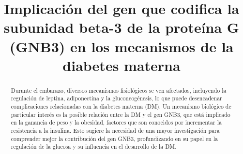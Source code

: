 \documentclass{bmcart}
\begin{document}
	\begin{frontmatter}
	
		\begin{fmbox}
			
			
			\title{Implicación del gen que codifica la subunidad beta-3 de la proteína G (GNB3) en los mecanismos de la diabetes materna}
			
			
			\author[
			  addressref={aff1},                   %
			  corref={aff1},                       %
			  email={victorgo@uma.es}   %
			]{ } %
			\author[
			  addressref={aff2},
			  email={susanafernandez@uma.es}
			]{ }
			\author[
			addressref={aff3},
			email={pablobermudezgamez@uma.es}
			]{ }
			\author[
			addressref={aff4},
			email={juancavergara6@uma.es}
			]{ }
			
			
			\address[id=aff1]{%
			  ,             %
			  ,          %
			  ,                              %
			}
		
		\end{fmbox}%
		
		\begin{abstractbox}
		
			\begin{abstract} %
			
			
			Durante el embarazo, diversos mecanismos fisiológicos se ven afectados, incluyendo la regulación de leptina, adiponectina y la gluconeogénesis, lo que puede desencadenar complicaciones relacionadas con la diabetes materna (DM). Un mecanismo biológico de particular interés es la posible relación entre la DM y el gen GNB3, que está implicado en la ganancia de peso y la obesidad, factores que son conocidos por incrementar la resistencia a la insulina. Esto sugiere la necesidad de una mayor investigación para comprender mejor la contribución del gen GNB3, profundizando en su papel en la regulación de la glucosa y su influencia en el desarrollo de la DM.
			

\end{abstract}
\end{abstractbox}
\end{frontmatter}
\end{document}
